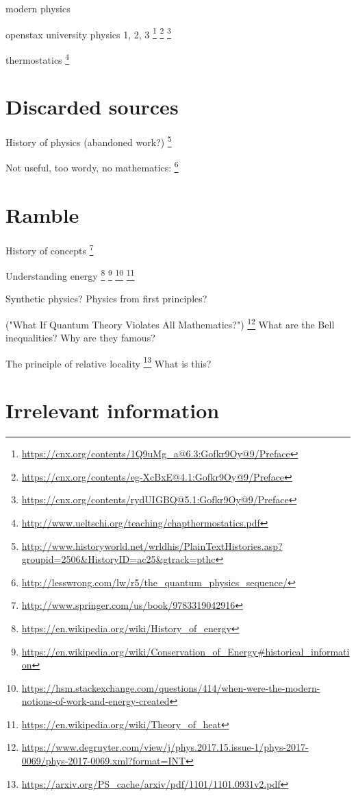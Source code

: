 
modern physics

openstax university physics 1, 2, 3%
\footnote{\url{https://cnx.org/contents/1Q9uMg_a@6.3:Gofkr9Oy@9/Preface}}%
\footnote{\url{https://cnx.org/contents/eg-XcBxE@4.1:Gofkr9Oy@9/Preface}}%
\footnote{\url{https://cnx.org/contents/rydUIGBQ@5.1:Gofkr9Oy@9/Preface}}

thermostatics%
\footnote{\url{http://www.ueltschi.org/teaching/chapthermostatics.pdf}}

\section{Discarded sources}

History of physics (abandoned work?)%
\footnote{\url{http://www.historyworld.net/wrldhis/PlainTextHistories.asp?groupid=2506&HistoryID=ac25&gtrack=pthc}}

Not useful, too wordy, no mathematics:%
\footnote{\url{http://lesswrong.com/lw/r5/the_quantum_physics_sequence/}}

\section{Ramble}

History of concepts%
\footnote{\url{http://www.springer.com/us/book/9783319042916}}

Understanding energy%
\footnote{\url{https://en.wikipedia.org/wiki/History_of_energy}}%
\footnote{\url{https://en.wikipedia.org/wiki/Conservation_of_Energy\#historical_information}}%
\footnote{\url{https://hsm.stackexchange.com/questions/414/when-were-the-modern-notions-of-work-and-energy-created}}%
\footnote{\url{https://en.wikipedia.org/wiki/Theory_of_heat}}

Synthetic physics?
Physics from first principles?

("What If Quantum Theory Violates All Mathematics?")%
\footnote{\url{https://www.degruyter.com/view/j/phys.2017.15.issue-1/phys-2017-0069/phys-2017-0069.xml?format=INT}}
What are the Bell inequalities?
Why are they famous?

The principle of relative locality%
\footnote{\url{https://arxiv.org/PS_cache/arxiv/pdf/1101/1101.0931v2.pdf}}
What is this?

\section{Irrelevant information}

